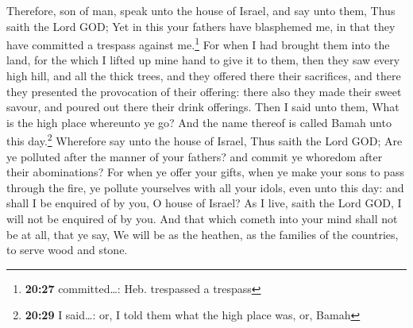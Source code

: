  Therefore, son of man, speak unto the house of Israel,
and say unto them, Thus saith the Lord GOD; Yet in this your fathers
have blasphemed me, in that they have committed a trespass against
me.\footnote{\textbf{20:27} committed\ldots: Heb. trespassed a trespass}
 For when I had brought them into the land, for the which
I lifted up mine hand to give it to them, then they saw every high hill,
and all the thick trees, and they offered there their sacrifices, and
there they presented the provocation of their offering: there also they
made their sweet savour, and poured out there their drink offerings.
 Then I said unto them, What is the high place whereunto
ye go? And the name thereof is called Bamah unto this day.\footnote{\textbf{20:29}
  I said\ldots: or, I told them what the high place was, or, Bamah}
 Wherefore say unto the house of Israel, Thus saith the
Lord GOD; Are ye polluted after the manner of your fathers? and commit
ye whoredom after their abominations?  For when ye offer
your gifts, when ye make your sons to pass through the fire, ye pollute
yourselves with all your idols, even unto this day: and shall I be
enquired of by you, O house of Israel? As I live, saith the Lord GOD, I
will not be enquired of by you.  And that which cometh
into your mind shall not be at all, that ye say, We will be as the
heathen, as the families of the countries, to serve wood and stone.


